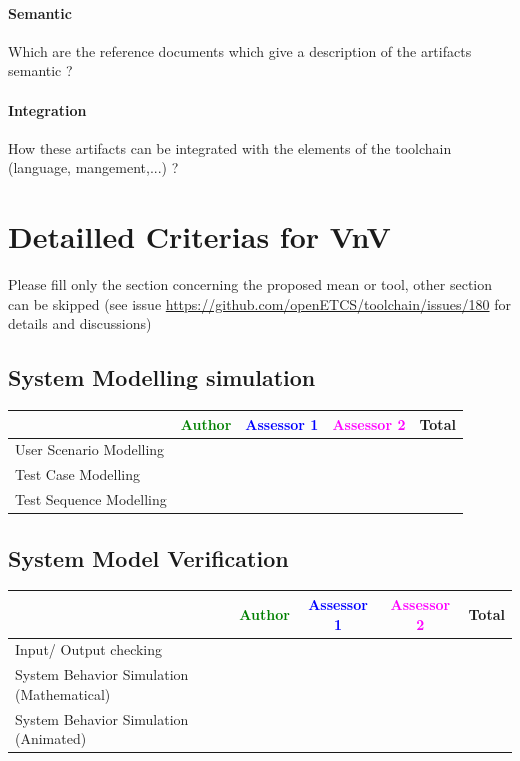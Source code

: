 \paragraph{Semantic}
    Which are the reference documents which give a description of the artifacts semantic  ?


\paragraph{Integration}
    How these artifacts can be integrated with the elements of the toolchain (language, mangement,...) ?


\section{Detailled Criterias for VnV}

Please  fill only the section concerning the proposed mean or tool, other section can be skipped (see issue \url{https://github.com/openETCS/toolchain/issues/180} for details and discussions)



\subsection{System Modelling simulation}	

\begin{tabular}{|l | c | c | c | c|}
\hline
& \textcolor{green}{Author} & \textcolor{blue}{Assessor 1} & \textcolor{magenta}{Assessor 2} & Total \\
\hline 
User Scenario Modelling & & & &  \\
\hline
Test Case Modelling & & & &  \\
\hline
Test Sequence Modelling & & & &  \\
\hline
\end{tabular}
	
\subsection{System Model Verification}	


\begin{tabular}{|l | c | c | c | c|}
\hline
& \textcolor{green}{Author} & \textcolor{blue}{Assessor 1} & \textcolor{magenta}{Assessor 2} & Total \\
\hline 
Input/ Output checking & & & &  \\
\hline
System Behavior Simulation (Mathematical) & & & &  \\
\hline
System Behavior Simulation (Animated) & & & &  \\
\hline
\end{tabular}


